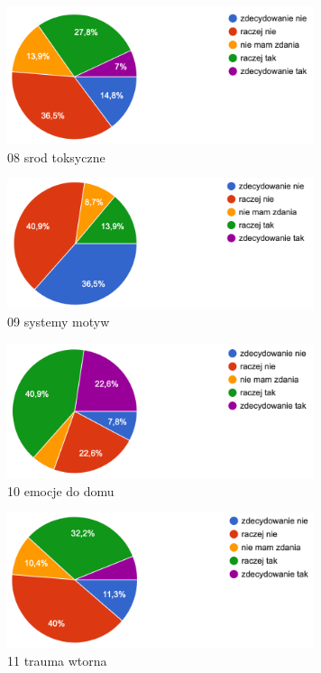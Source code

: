 \begin{figure}
    \includegraphics[width=9cm]{wyniki/08_srod_toksyczne}
    \caption{ 08 srod toksyczne }
\end{figure}

\begin{figure}
    \includegraphics[width=9cm]{wyniki/09_systemy_motyw}
    \caption{ 09 systemy motyw }
\end{figure}

\begin{figure}
    \includegraphics[width=9cm]{wyniki/10_emocje_do_domu}
    \caption{ 10 emocje do domu }
\end{figure}

\begin{figure}
    \includegraphics[width=9cm]{wyniki/11_trauma_wtorna}
    \caption{ 11 trauma wtorna }
\end{figure}

